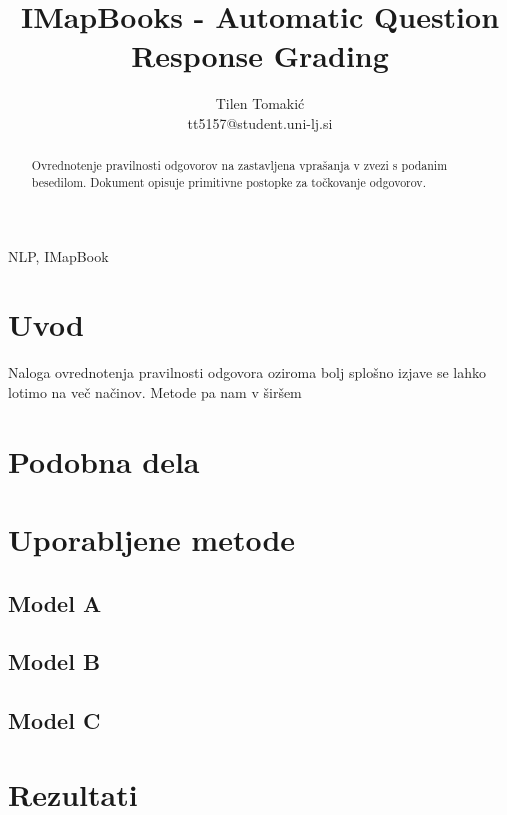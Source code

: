 \documentclass[journal]{IEEEtran}
\begin{document}
\title{IMapBooks - Automatic Question Response Grading}
\author{Tilen Tomakić\\tt5157@student.uni-lj.si}%
\maketitle

\begin{abstract}	
  Ovrednotenje pravilnosti odgovorov na zastavljena vprašanja v zvezi s podanim besedilom. Dokument opisuje primitivne postopke za točkovanje odgovorov.
\end{abstract}

\begin{IEEEkeywords}
NLP, IMapBook
\end{IEEEkeywords}

\IEEEpeerreviewmaketitle

\section{Uvod}
Naloga ovrednotenja pravilnosti odgovora oziroma bolj splošno izjave se lahko lotimo na več načinov. Metode pa nam v širšem

\section{Podobna dela}


\section{Uporabljene metode}
\subsection{Model A}
\subsection{Model B}
\subsection{Model C}

\section{Rezultati}
\end{document}
